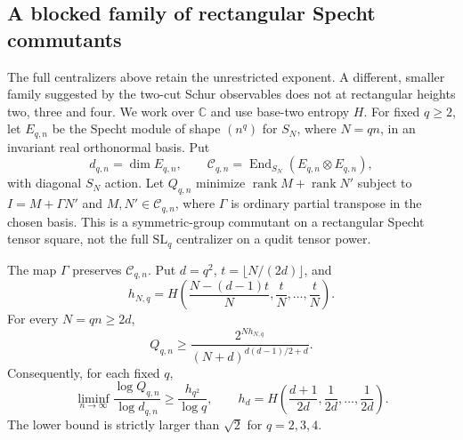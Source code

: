 \subsection{A blocked family of rectangular Specht commutants}
\label{sec:rectangular-specht-barrier}

The full centralizers above retain the unrestricted exponent. A different,
smaller family suggested by the two-cut Schur observables does not at
rectangular heights two, three and four.
We work over $\mathbb C$ and use base-two entropy $H$.
For fixed $q\ge2$, let $E_{q,n}$ be the Specht module of shape $(n^q)$
for $S_N$, where $N=qn$, in an invariant real orthonormal basis. Put
\[
 d_{q,n}=\dim E_{q,n},\qquad
 \mathcal C_{q,n}=\operatorname{End}_{S_N}(E_{q,n}\otimes E_{q,n}),
\]
with diagonal $S_N$ action. Let $Q_{q,n}$ minimize
$\operatorname{rank}M+\operatorname{rank}N'$ subject to
$I=M+\Gamma N'$ and $M,N'\in\mathcal C_{q,n}$, where $\Gamma$ is
ordinary partial transpose in the chosen basis.
This is a symmetric-group commutant on a rectangular Specht tensor
square, not the full $\mathrm{SL}_q$ centralizer on a qudit tensor power.

\begin{proposition}
\label{prop:rectangular-specht-barrier}
The map $\Gamma$ preserves $\mathcal C_{q,n}$. Put $d=q^2$,
$t=\lfloor N/(2d)\rfloor$, and
\[
 h_{N,q}=H\left(\frac{N-(d-1)t}{N},
                    \frac tN,\ldots,\frac tN\right).
\]
For every $N=qn\ge2d$,
\begin{equation}\label{eq:rectangular-specht-finite}
 Q_{q,n}\ge
 \frac{2^{Nh_{N,q}}}{(N+d)^{d(d-1)/2+d}}.
\end{equation}
Consequently, for each fixed $q$,
\begin{equation}\label{eq:rectangular-specht-exponent}
 \liminf_{n\to\infty}\frac{\log Q_{q,n}}{\log d_{q,n}}
 \ge\frac{h_{q^2}}{\log q},\qquad
 h_d=H\left(\frac{d+1}{2d},\frac1{2d},\ldots,\frac1{2d}\right).
\end{equation}
The lower bound is strictly larger than $\sqrt2$ for $q=2,3,4$.
\end{proposition}

